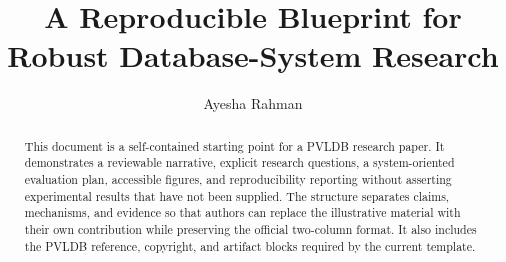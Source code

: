 \documentclass[sigconf,nonacm]{acmart}
\begin{document}
\title{A Reproducible Blueprint for Robust Database-System Research}

\author{Ayesha Rahman}

\begin{abstract}
This document is a self-contained starting point for a PVLDB research paper.
It demonstrates a reviewable narrative, explicit research questions, a
system-oriented evaluation plan, accessible figures, and reproducibility
reporting without asserting experimental results that have not been supplied.
The structure separates claims, mechanisms, and evidence so that authors can
replace the illustrative material with their own contribution while preserving
the official two-column format.  It also includes the PVLDB reference,
copyright, and artifact blocks required by the current template.
\end{abstract}


\maketitle

\noindent{}
\vspace{0.8em}



\vldbtopmatter









\end{document}
